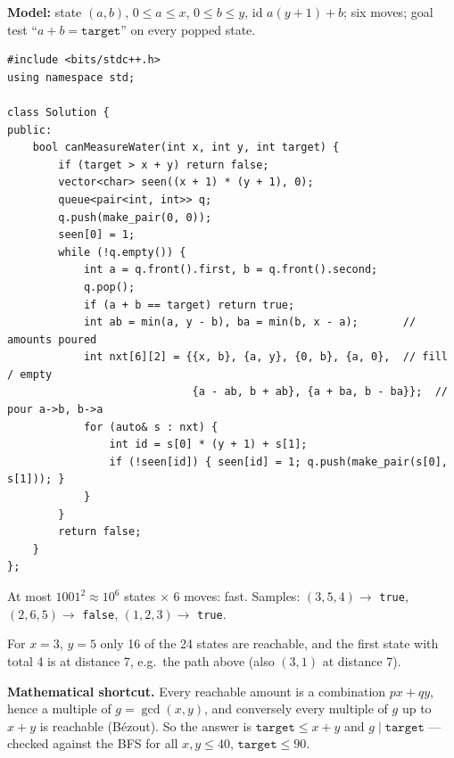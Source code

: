 \begin{solutionbox}
\textbf{Model:} state $(a, b)$, $0 \le a \le x$, $0 \le b \le y$, id $a(y{+}1) + b$; six moves; goal test ``$a + b = \texttt{target}$'' on every popped state.
\begin{lstlisting}[style=cpp]
#include <bits/stdc++.h>
using namespace std;

class Solution {
public:
    bool canMeasureWater(int x, int y, int target) {
        if (target > x + y) return false;
        vector<char> seen((x + 1) * (y + 1), 0);
        queue<pair<int, int>> q;
        q.push(make_pair(0, 0));
        seen[0] = 1;
        while (!q.empty()) {
            int a = q.front().first, b = q.front().second;
            q.pop();
            if (a + b == target) return true;
            int ab = min(a, y - b), ba = min(b, x - a);       // amounts poured
            int nxt[6][2] = {{x, b}, {a, y}, {0, b}, {a, 0},  // fill / empty
                             {a - ab, b + ab}, {a + ba, b - ba}};  // pour a->b, b->a
            for (auto& s : nxt) {
                int id = s[0] * (y + 1) + s[1];
                if (!seen[id]) { seen[id] = 1; q.push(make_pair(s[0], s[1])); }
            }
        }
        return false;
    }
};
\end{lstlisting}
At most $1001^2 \approx 10^6$ states $\times$ 6 moves: fast. Samples: $(3,5,4) \to$ \texttt{true}, $(2,6,5) \to$ \texttt{false}, $(1,2,3) \to$ \texttt{true}.

\begin{center}
\end{center}
For $x=3$, $y=5$ only 16 of the 24 states are reachable, and the first state with total 4 is at distance 7, e.g.\ the path above (also $(3,1)$ at distance 7).

\textbf{Mathematical shortcut.} Every reachable amount is a combination $px + qy$, hence a multiple of $g = \gcd(x, y)$, and conversely every multiple of $g$ up to $x + y$ is reachable (B\'ezout). So the answer is $\texttt{target} \le x + y$ and $g \mid \texttt{target}$ --- checked against the BFS for all $x, y \le 40$, $\texttt{target} \le 90$.
\end{solutionbox}

